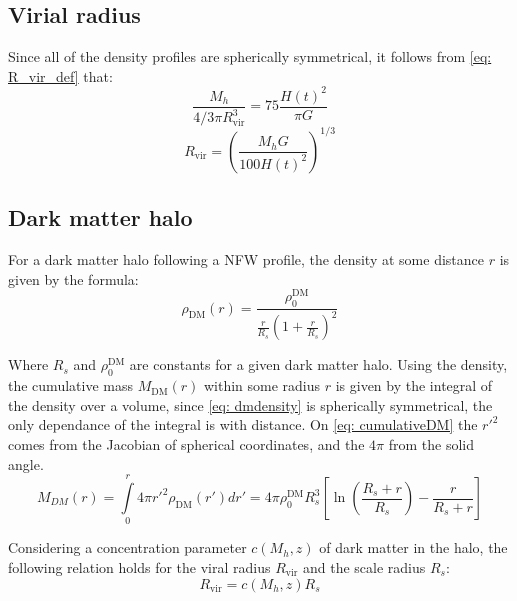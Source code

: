 	\subsection{Virial radius}
		Since all of the density profiles are spherically symmetrical, it follows from \autoref{eq: R_vir_def} that:  
		\begin{equation}
			\dfrac{M_h}{4/3\pi R_\text{vir}^3} = 75\dfrac{H(t)^2}{\pi G}
		\end{equation}
		\begin{equation}
			R_\text{vir} = \left({\dfrac{M_hG}{100 H(t)^2}}\right)^{1/3}
		\end{equation}
	
	\subsection{Dark matter halo}
		For a dark matter halo following a NFW profile, the density at some distance $r$ is given by the formula:
		\begin{equation}\label{eq: dmdensity}
			\rho_\text{DM}(r) = \dfrac{\rho_0^\text{DM}}{\frac{r}{R_s}\left(1 + \frac{r}{R_s}\right)^2}
		\end{equation}
		
		Where $R_s$ and $\rho_0^\text{DM}$ are constants for a given dark matter halo. Using the density, the cumulative mass $M_\text{DM}(r)$ within some radius $r$ is given by the integral of the density over a volume, since \autoref{eq: dmdensity} is spherically symmetrical, the only dependance of the integral is with distance. On \autoref{eq: cumulativeDM} the $r'^2$ comes from the Jacobian of spherical coordinates, and the $4\pi$ from the solid angle.
		\begin{equation}\label{eq: cumulativeDM}
			M_{DM}(r) = \int\limits_0^{r} 4\pi {r'}^2\rho_\text{DM}(r')dr' = 4\pi\rho_0^\text{DM}R_s^3\left[\ln\left(\dfrac{R_s + r}{R_s}\right) - \dfrac{r}{R_s + r}\right]
		\end{equation}
		
		
		
		
		Considering a concentration parameter $c(M_h, z)$ of dark matter in the halo, the following relation holds for the viral radius $R_\text{vir}$ and the scale radius $R_s$:
		\begin{equation}\label{eq: virialConcentration}
			R_\text{vir} = c(M_h, z)R_s
		\end{equation}
		
